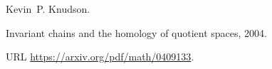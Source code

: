 Kevin~P. Knudson.

\newblock Invariant chains and the homology of quotient spaces, 2004.

\newblock URL \url{https://arxiv.org/pdf/math/0409133}.


